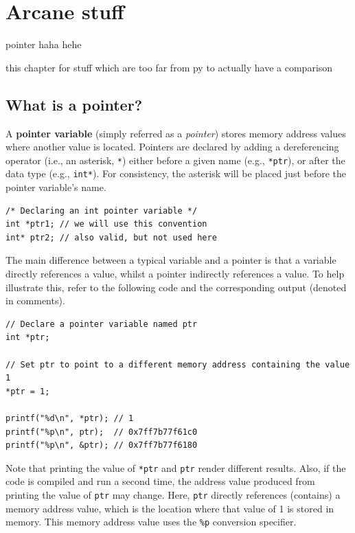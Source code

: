 \chapter{Arcane stuff}

pointer haha hehe

this chapter for stuff which are too far from py to actually have a comparison

\section{What is a pointer?}

A \textbf{pointer variable} (simply referred as a \textit{pointer}) stores memory address values where another value is located.
Pointers are declared by adding a dereferencing operator (i.e., an asterisk, \verb|*|) either before a given name (e.g., \verb|*ptr|), or after the data type (e.g., \verb|int*|).
For consistency, the asterisk will be placed just before the pointer variable's name.

\begin{verbatim}
/* Declaring an int pointer variable */
int *ptr1; // we will use this convention
int* ptr2; // also valid, but not used here
\end{verbatim}

The main difference between a typical variable and a pointer is that a variable directly references a value, whilst a pointer indirectly references a value.
To help illustrate this, refer to the following code and the corresponding output (denoted in comments).

\begin{verbatim}
// Declare a pointer variable named ptr
int *ptr;

// Set ptr to point to a different memory address containing the value 1
*ptr = 1;

printf("%d\n", *ptr); // 1
printf("%p\n", ptr);  // 0x7ff7b77f61c0
printf("%p\n", &ptr); // 0x7ff7b77f6180
\end{verbatim}

Note that printing the value of \verb|*ptr| and \verb|ptr| render different results.
Also, if the code is compiled and run a second time, the address value produced from printing the value of \verb|ptr| may change.
Here, \verb|ptr| directly references (contains) a memory address value, which is the location where that value of 1 is stored in memory.
This memory address value uses the \verb|%p| conversion specifier.

